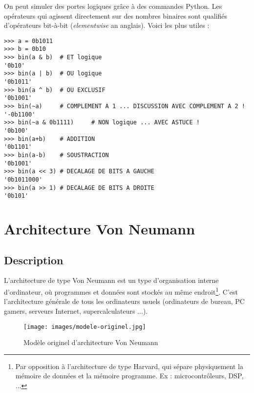\documentclass[11pt,a4paper,french,twoside]{PMCours}
\begin{document}
On peut simuler des portes logiques grâce à des commandes Python. Les opérateurs qui agissent directement sur des nombres binaires sont qualifiés d'opérateurs bit-à-bit (\emph{elementwise} an anglais). Voici les plus utiles : 
\begin{verbatim}
>>> a = 0b1011
>>> b = 0b10 
>>> bin(a & b)  # ET logique
'0b10'
>>> bin(a | b)  # OU logique
'0b1011'
>>> bin(a ^ b)  # OU EXCLUSIF
'0b1001'
>>> bin(~a)     # COMPLEMENT A 1 ... DISCUSSION AVEC COMPLEMENT A 2 !
'-0b1100'
>>> bin(~a & 0b1111)     # NON logique ... AVEC ASTUCE !
'0b100'
>>> bin(a+b)    # ADDITION
'0b1101'
>>> bin(a-b)    # SOUSTRACTION
'0b1001'
>>> bin(a << 3) # DECALAGE DE BITS A GAUCHE
'0b1011000'
>>> bin(a >> 1) # DECALAGE DE BITS A DROITE
'0b101'
\end{verbatim}


\section{Architecture Von Neumann}

\subsection{Description}

\begin{Definition}{}
L'architecture de type Von Neumann est un type d'organisation interne d'ordinateur, où programmes et données sont stockés au même endroit\footnote{Par opposition à l'architecture de type Harvard, qui sépare physiquement la mémoire de données et la mémoire programme. Ex : microcontrôleurs, DSP, ...}. C'est l'architecture générale de tous les ordinateurs usuels (ordinateurs de bureau, PC gamers, serveurs Internet, supercalculateurs ...).
\end{Definition}
\begin{center}
\begin{figure}[ht]
\centering
\texttt{[image: images/modele-originel.jpg]}
 \caption{Modèle originel d'architecture Von Neumann}
\end{figure}
\end{center}
\end{document}
